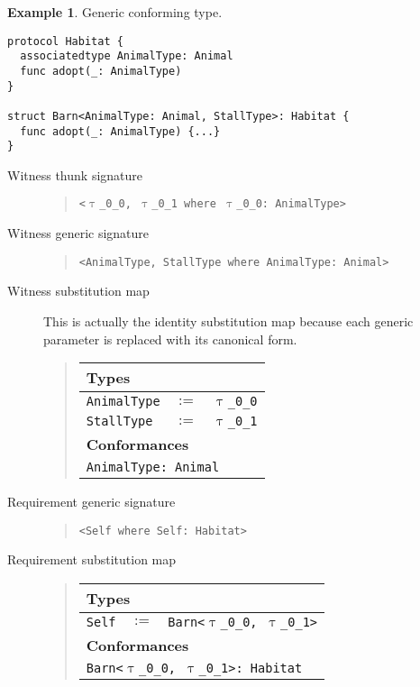 \documentclass[a4paper,headsepline,bibliography=totoc,toc=flat,fleqn,twoside=semi]{scrbook}
\theoremstyle{definition}
\theoremstyle{definition}
\newtheorem{example}{Example}[chapter]
\theoremstyle{definition}
\newcommand{\ttgp}[2]{\texttt{$\uptau$\_#1\_#2}}
\newcommand{\SubMapC}[2]{\begin{tabular}{|lll|}
\hline
\multicolumn{3}{|l|}{\textbf{Types}}\\
\hline
#1\\
\hline
\hline
\multicolumn{3}{|l|}{\textbf{Conformances}}\\
\hline
#2\\
\hline
\end{tabular}}
\newcommand{\SubType}[2]{\texttt{#1}&$:=$&\texttt{#2}}
\newcommand{\SubConf}[1]{\multicolumn{3}{|l|}{\texttt{#1}}}
\begin{document}
\vfill
\eject

\begin{example} Generic conforming type.
\begin{Verbatim}
protocol Habitat {
  associatedtype AnimalType: Animal
  func adopt(_: AnimalType)
}

struct Barn<AnimalType: Animal, StallType>: Habitat {
  func adopt(_: AnimalType) {...}
}
\end{Verbatim}
\begin{description}
\item[Witness thunk signature]  \vphantom{a}
\begin{quote}
\texttt{<\ttgp{0}{0}, \ttgp{0}{1} where \ttgp{0}{0}:\ AnimalType>}
\end{quote}
\item[Witness generic signature]  \vphantom{a}
\begin{quote}
\texttt{<AnimalType, StallType where AnimalType:\ Animal>}
\end{quote}
\item[Witness substitution map] This is actually the identity substitution map because each generic parameter is replaced with its canonical form.
\begin{quote}
\SubMapC{
\SubType{AnimalType}{\ttgp{0}{0}}\\
\SubType{StallType}{\ttgp{0}{1}}
}{
\SubConf{AnimalType:\ Animal}
}
\end{quote}

\item[Requirement generic signature]  \vphantom{a}
\begin{quote}
\texttt{<Self where Self:\ Habitat>}
\end{quote}
\item[Requirement substitution map] \phantom{a}
\begin{quote}
\SubMapC{
\SubType{Self}{Barn<\ttgp{0}{0}, \ttgp{0}{1}>}
}{
\SubConf{Barn<\ttgp{0}{0}, \ttgp{0}{1}>:\ Habitat}
}
\end{quote}
\end{description}
\end{example}

\vfill
\eject
\end{document}
